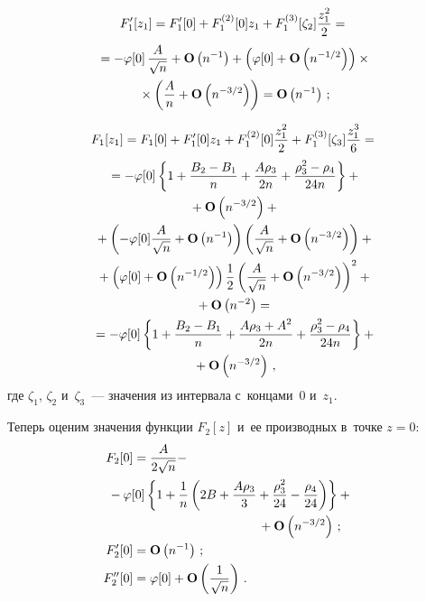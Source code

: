 \begin{multicols}{2}
 \vspace*{-12pt}
 
 \noindent
 \begin{multline}
 F_1'[z_{1}]= F_1'[0]+F_1^{(2)}[0] z_{1}+F_1^{(3)}[\zeta_2] \fr{z^2_{1}}{2}={}
\\
  {}=-\varphi[0]\,\fr{A}{\sqrt{n}}+\mathbf{O}\left(n^{-1}\right)
  +\left(\varphi[0]+\mathbf{O}\left(n^{-1/2}\right)\right)\times{}\\
  {}\times
  \left(\fr{A}{n}+\mathbf{O}\left(n^{-3/2}\right)\right)=
  \mathbf{O}\left(n^{-1}\right)\,;
 \label{e46-ch}
 \end{multline}
 
 \vspace*{-12pt}
 
 \noindent
 \begin{multline}
 F_1[z_{1}]=F_1[0]+ F'_1[0] z_{1}+F_1^{(2)}[0] \fr{z_{1}^2}{2}
 +F_1^{(3)}[\zeta_3] \fr{z_{1}^3}{6}={}
\\
 {}=-\varphi[0]\left\{ 1+\fr{B_2-B_1}{n}+\fr{A\rho_3}{2n}
 +\fr{\rho_3^2-\rho_4  }{24n} \right\}
 +{}\\
 {}+\mathbf{O}\left(n^{-3/2}\right)+{}
\\
{} +\left(-\varphi[0]\fr{A}{\sqrt{n}}+\mathbf{O}\left(n^{-1}\right)\right)
 \left(\fr{A}{\sqrt{n}}+\mathbf{O}\left(n^{-3/2}\right)\right)+{}
 \\
{} +\left(\varphi[0]+\mathbf{O}\left(n^{-1/2}\right)\right)
 \fr{1}{2}\left(\fr{A}{\sqrt{n}}+\mathbf{O}\left(n^{-3/2}\right)\right)^2
 +{}\\
 {}+\mathbf{O}\left(n^{-2}\right)={}
\\
 {}=-\varphi[0]\left\{ 1+\fr{B_2-B_1}{n}+\fr{A\rho_3+A^2}{2n}
 +\fr{\rho_3^2-\rho_4  }{24n} \right\}+{}\\
{} +\mathbf{O}\left(n^{-3/2}\right)\,,
 \label{e47-ch}
 \end{multline}
 где $\zeta_1$, $\zeta_2$ и~$\zeta_3$~--- значения из интервала с~концами~$0$ и~$z_1$.

 Теперь оценим значения функции $F_2[z]$ и~ее производных в~точке $z=0$:
 \begin{align}
 F_2[0]&=
 \fr{A}{2\sqrt{n}} -&{}\notag\\
 &\hspace*{-7mm}{}-\varphi[0]\left\{ 1+\fr{1}{n}
 \left(2B+\fr{A\rho_3 }{3} +\fr{\rho_3^2}{24}
 -\fr{\rho_4}{24}\right)\right\}+{}\notag\\
& \hspace*{35mm}{}+\mathbf{O}\left(n^{-3/2}\right)\,;
 \label{e48-ch}\\
 F'_2[0]&=\mathbf{O}\left(n^{-1}\right)\,;
 \label{e49-ch}\\
 F''_2[0]&= \varphi[0]+\mathbf{O}\left(\fr{1}{\sqrt{n}}\right)\,.
  \label{e50-ch}
 \end{align}


\end{multicols}
